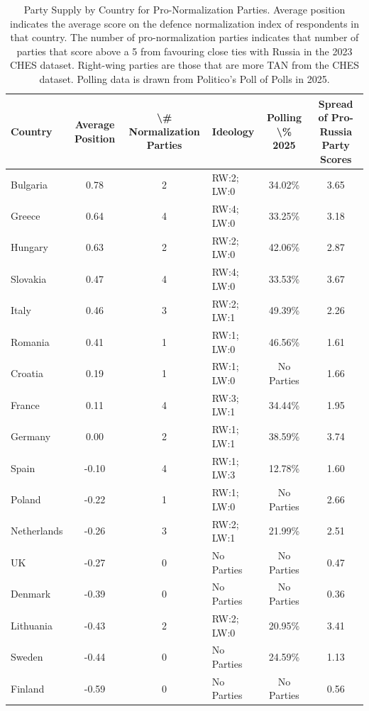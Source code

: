 \begin{table}

\caption{Party Supply by Country for Pro-Normalization Parties. Average position indicates the average score on the defence normalization index of respondents in that country. The number of pro-normalization parties indicates that number of parties that score above a 5 from favouring close ties with Russia in the 2023 CHES dataset. Right-wing parties are those that are more TAN from the CHES dataset. Polling data is drawn from Politico's Poll of Polls in 2025.\label{tab:party_supply}}
\centering
\begin{tabular}[t]{lcclcc}
\toprule
Country & Average Position & \textbackslash{}\# Normalization Parties & Ideology & Polling \textbackslash{}\% 2025 & Spread of Pro-Russia Party Scores\\
\midrule
Bulgaria & 0.78 & 2 & RW:2; LW:0 & 34.02\% & 3.65\\
Greece & 0.64 & 4 & RW:4; LW:0 & 33.25\% & 3.18\\
Hungary & 0.63 & 2 & RW:2; LW:0 & 42.06\% & 2.87\\
Slovakia & 0.47 & 4 & RW:4; LW:0 & 33.53\% & 3.67\\
Italy & 0.46 & 3 & RW:2; LW:1 & 49.39\% & 2.26\\
Romania & 0.41 & 1 & RW:1; LW:0 & 46.56\% & 1.61\\
Croatia & 0.19 & 1 & RW:1; LW:0 & No Parties & 1.66\\
France & 0.11 & 4 & RW:3; LW:1 & 34.44\% & 1.95\\
Germany & 0.00 & 2 & RW:1; LW:1 & 38.59\% & 3.74\\
Spain & -0.10 & 4 & RW:1; LW:3 & 12.78\% & 1.60\\
Poland & -0.22 & 1 & RW:1; LW:0 & No Parties & 2.66\\
Netherlands & -0.26 & 3 & RW:2; LW:1 & 21.99\% & 2.51\\
UK & -0.27 & 0 & No Parties & No Parties & 0.47\\
Denmark & -0.39 & 0 & No Parties & No Parties & 0.36\\
Lithuania & -0.43 & 2 & RW:2; LW:0 & 20.95\% & 3.41\\
Sweden & -0.44 & 0 & No Parties & 24.59\% & 1.13\\
Finland & -0.59 & 0 & No Parties & No Parties & 0.56\\
\bottomrule
\end{tabular}
\end{table}

